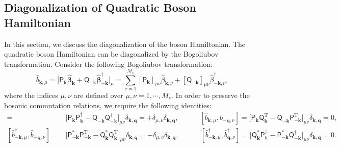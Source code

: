 \documentclass[aps, prx, nofootinbib, superscriptaddress]{revtex4-2}
\begin{document}
\subsection{Diagonalization of Quadratic Boson Hamiltonian}

In this section, we discuss the diagonalization of the boson Hamiltonian. 
The quadratic boson Hamiltonian can be diagonalized by the Bogoliubov transformation. 
Consider the following Bogoliubov transformation:
\begin{equation}
    \hat{b}_{\mathbf{k}, \mu} 
    = \big[ \mathsf{P}_{\mathbf{k}}^{\phantom \dagger} \hat{\bm \beta}_{\mathbf{k}}^{\phantom \dagger} + \mathsf{Q}_{-\mathbf{k}}^{\phantom \dagger} \hat{\bm \beta}_{-\mathbf{k}}^{\dagger} \big]_{\mu}
    = \sum_{\nu = 1}^{M_s} [\mathsf{P}_{\mathbf{k}}]_{\mu\nu}^{\phantom \dagger} \hat{\beta}_{\mathbf{k}, \nu}^{\phantom \dagger} + [\mathsf{Q}_{-\mathbf{k}}]_{\mu\nu}^{\phantom \dagger} \hat{\beta}_{-\mathbf{k}, \nu}^{\dagger},
\end{equation}
where the indices $\mu, \nu$ are defined over $\mu, \nu = 1, \cdots, M_s$.
In order to preserve the bosonic commutation relations, we require the following identities:
\begin{align*}
    [\hat{b}_{  \mathbf{k}, \mu}^{\phantom \dagger}, \hat{b}_{  \mathbf{q}, \nu}^{\dagger}] 
    = & \big[ \mathsf{P}_{\mathbf{k}}\mathsf{P}_{\mathbf{k}}^{\dagger} - \mathsf{Q}_{-\mathbf{k}}\mathsf{Q}_{-\mathbf{k}}^{\dagger} \big]_{\mu\nu} \delta_{\mathbf{k},\mathbf{q}}
    = + \delta_{\mu,\nu}    \delta_{\mathbf{k}, \mathbf{q}} ,
    \qquad \quad
    [\hat{b}_{  \mathbf{k}, \mu}, \hat{b}_{-\mathbf{q}, \nu}] 
    = \big[ \mathsf{P}_{\mathbf{k}}\mathsf{Q}_{\mathbf{k}}^{\mathrm{T}} - \mathsf{Q}_{-\mathbf{k}}\mathsf{P}_{-\mathbf{k}}^{\mathrm{T}} \big]_{\mu\nu} \delta_{\mathbf{k},\mathbf{q}} = 0, \\
    [\hat{b}_{-\mathbf{k}, \mu}^{\dagger}, \hat{b}_{-\mathbf{q}, \nu}^{\phantom \dagger}] 
    = & \big[ \mathsf{P}_{-\mathbf{k}}^{*}\mathsf{P}_{-\mathbf{k}}^{\mathrm{T}} - \mathsf{Q}_{\mathbf{k}}^{*}\mathsf{Q}_{\mathbf{k}}^{\mathrm{T}} \big]_{\mu\nu} \delta_{\mathbf{k},\mathbf{q}}
    = - \delta_{\mu,\nu}    \delta_{\mathbf{k}, \mathbf{q}}, 
    \qquad \quad
    [\hat{b}_{-\mathbf{k}, \mu}^{\dagger}, \hat{b}_{  \mathbf{q}, \nu}^{\dagger}] 
    = \big[ \mathsf{Q}_{\mathbf{k}}^{*}\mathsf{P}_{\mathbf{k}}^{\dagger} - \mathsf{P}_{-\mathbf{k}}^{*}\mathsf{Q}_{-\mathbf{k}}^{\dagger} \big]_{\mu\nu} \delta_{\mathbf{k},\mathbf{q}}
    = 0.
\end{align*}
\end{document}
